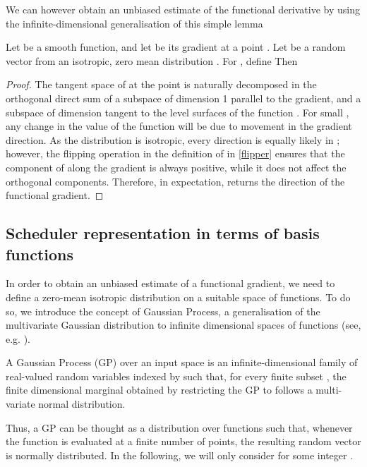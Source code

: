 We can however obtain an unbiased estimate of the functional derivative by using the infinite-dimensional generalisation of this simple lemma
\begin{lemma}\label{finDimGrad}
Let  be a smooth function, and let  be its gradient at a point . 
Let  be a random vector from an isotropic, zero mean distribution . 
For , define  
Then
\end{lemma}
\begin{proof}
The tangent space of  at the point  is naturally decomposed in the orthogonal direct sum of a subspace of dimension 1 parallel to the gradient, and a subspace of dimension  tangent to the level surfaces of the function . 
For small , any change in the value of the function  will be due to movement in the gradient direction. 
As the distribution  is isotropic, every direction is equally likely in ; however, the flipping operation in the definition of  in \eqref{flipper} ensures that the component of  along the gradient  is always positive, while it does not affect the orthogonal components. 
Therefore, in expectation,  returns the direction of the functional gradient.
\end{proof}



\subsection{Scheduler representation in terms of basis functions}

In order to obtain an unbiased estimate of a functional gradient, we need to define a zero-mean isotropic distribution on a suitable space of functions. To do so, we introduce the concept of Gaussian Process, a generalisation of the multivariate Gaussian distribution to infinite dimensional spaces of functions (see, e.g. \cite{Rasmussen2006}).

\begin{definition} A Gaussian Process (GP) over an input space  is an infinite-dimensional family of real-valued random variables indexed by  such that, for every finite subset , the finite dimensional marginal obtained by restricting the GP to  follows a multi-variate normal distribution.
\end{definition}
Thus, a GP can be thought as a distribution over functions  such that, whenever the function is evaluated at a finite number of points, the resulting random vector is normally distributed. In the following, we will only consider  for some integer .

